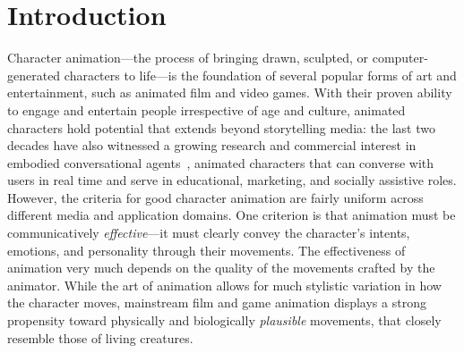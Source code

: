 \pagestyle{deposit}

\chapter{Introduction}

Character animation---the process of bringing drawn, sculpted, or computer-generated characters to life---is the foundation of several popular forms of art and entertainment, such as animated film and video games. With their proven ability to engage and entertain people irrespective of age and culture, animated characters hold potential that extends beyond storytelling media: the last two decades have also witnessed a growing research and commercial interest in embodied conversational agents~\citep{cassell2000embodied}, animated characters that can converse with users in real time and serve in educational, marketing, and socially assistive roles.
However, the criteria for good character animation are fairly uniform across different media and application domains. One criterion is that animation must be communicatively \emph{effective}---it must clearly convey the character's intents, emotions, and personality through their movements.
The effectiveness of animation very much depends on the quality of the movements crafted by the animator. While the art of animation allows for much stylistic variation in how the character moves, mainstream film and game animation displays a strong propensity toward physically and biologically \emph{plausible} movements, that closely resemble those of living creatures.

